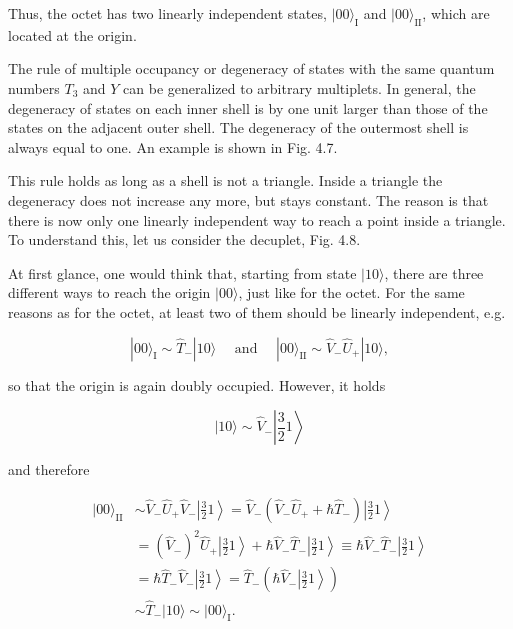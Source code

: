 \documentclass[10pt, letterpaper]{article}
\begin{document}
Thus, the octet has two linearly independent states, $|00\rangle_{\mathrm{I}}$ and $|00\rangle_{\mathrm{II}}$, which are located at the origin.

The rule of multiple occupancy or degeneracy of states with the same quantum numbers $T_{3}$ and $Y$ can be generalized to arbitrary multiplets. In general, the degeneracy of states on each inner shell is by one unit larger than those of the states on the adjacent outer shell. The degeneracy of the outermost shell is always equal to one. An example is shown in Fig. 4.7.

This rule holds as long as a shell is not a triangle. Inside a triangle the degeneracy does not increase any more, but stays constant. The reason is that there is now only one linearly independent way to reach a point inside a triangle. To understand this, let us consider the decuplet, Fig. 4.8.

At first glance, one would think that, starting from state $|10\rangle$, there are three different ways to reach the origin $|00\rangle$, just like for the octet. For the same reasons as for the octet, at least two of them should be linearly independent, e.g.

$$
|00\rangle_{\mathrm{I}} \sim \hat{T}_{-}|10\rangle \quad \text { and } \quad|00\rangle_{\mathrm{II}} \sim \hat{V}_{-} \hat{U}_{+}|10\rangle,
$$

so that the origin is again doubly occupied. However, it holds

$$
|10\rangle \sim \hat{V}_{-}\left|\frac{3}{2} 1\right\rangle
$$

and therefore

$$
\begin{aligned}
|00\rangle_{\mathrm{II}} & \sim \hat{V}_{-} \hat{U}_{+} \hat{V}_{-}\left|\frac{3}{2} 1\right\rangle=\hat{V}_{-}\left(\hat{V}_{-} \hat{U}_{+}+\hbar \hat{T}_{-}\right)\left|\frac{3}{2} 1\right\rangle \\
& =\left(\hat{V}_{-}\right)^{2} \hat{U}_{+}\left|\frac{3}{2} 1\right\rangle+\hbar \hat{V}_{-} \hat{T}_{-}\left|\frac{3}{2} 1\right\rangle \equiv \hbar \hat{V}_{-} \hat{T}_{-}\left|\frac{3}{2} 1\right\rangle \\
& =\hbar \hat{T}_{-} \hat{V}_{-}\left|\frac{3}{2} 1\right\rangle=\hat{T}_{-}\left(\hbar \hat{V}_{-}\left|\frac{3}{2} 1\right\rangle\right) \\
& \sim \hat{T}_{-}|10\rangle \sim|00\rangle_{\mathrm{I}} .
\end{aligned}
$$
\end{document}
